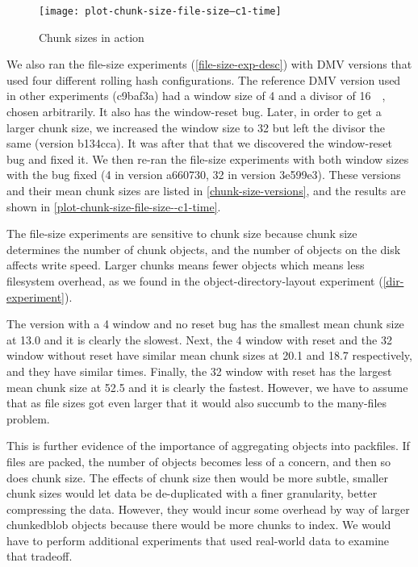 \begin{figure}[]
  \caption{Chunk sizes in action}
  \label{plot-chunk-size-file-size--c1-time}
  \centering
    \texttt{[image: plot-chunk-size-file-size--c1-time]}
\end{figure}

We also ran the file-size experiments (\autoref{file-size-exp-desc}) with DMV
versions that used four different rolling hash configurations. The reference DMV
version used in other experiments (c9baf3a) had a window size of \SI{4}{\kib}
and a divisor of \SI{16}{\kibi\relax}, chosen arbitrarily. It also has the
window-reset bug. Later, in order to get a larger chunk size, we increased the
window size to \SI{32}{\kib} but left the divisor the same (version b134cca). It
was after that that we discovered the window-reset bug and fixed it. We then
re-ran the file-size experiments with both window sizes with the bug fixed
(\SI{4}{\kib} in version a660730, \SI{32}{\kib} in version 3e599e3). These
versions and their mean chunk sizes are listed in \autoref{chunk-size-versions},
and the results are shown in \autoref{plot-chunk-size-file-size--c1-time}.

The file-size experiments are sensitive to chunk size because chunk size
determines the number of chunk objects, and the number of objects on the disk
affects write speed. Larger chunks means fewer objects which means less
filesystem overhead, as we found in the object-directory-layout experiment
(\autoref{dir-experiment}).

The version with a \SI{4}{\kib} window and no reset bug has the smallest mean
chunk size at \SI{13.0}{\kib} and it is clearly the slowest. Next, the
\SI{4}{\kib} window with reset and the \SI{32}{\kib} window without reset have
similar mean chunk sizes at \SI{20.1}{\kib} and \SI{18.7}{\kib} respectively,
and they have similar times. Finally, the \SI{32}{\kib} window with reset has
the largest mean chunk size at \SI{52.5}{\kib} and it is clearly the fastest.
However, we have to assume that as file sizes got even larger that it would also
succumb to the many-files problem.

This is further evidence of the importance of aggregating objects into
\glspl{packfile}. If files are packed, the number of objects becomes less of a
concern, and then so does chunk size. The effects of chunk size then would be
more subtle, smaller chunk sizes would let data be de-duplicated with a finer
granularity, better compressing the data. However, they would incur some
overhead by way of larger \gls{chunkedblob} objects because there would be more
chunks to index. We would have to perform additional experiments that used
real-world data to examine that tradeoff.

%
